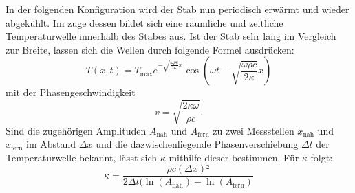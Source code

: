 In der folgenden Konfiguration wird der Stab nun periodisch erwärmt und
 wieder abgekühlt.
 Im zuge dessen bildet sich eine räumliche und zeitliche Temperaturwelle
  innerhalb des Stabes aus. Ist der Stab sehr lang im Vergleich zur Breite, lassen
   sich die Wellen durch folgende Formel ausdrücken:
  \begin{equation}
    T(x,t) = T_\text{max}e^{-\sqrt{{\frac{\omega \rho c}{2\kappa}}x}}\cos \left( \omega t - \sqrt{\frac{\omega \rho c}{2\kappa}}x \right)
  \end{equation}
mit der Phasengeschwindigkeit
\begin{equation}
  v = \sqrt{\frac{2 \kappa \omega}{\rho c}}\text{.}
\end{equation}
Sind die zugehörigen Amplituden $A_\text{nah}$ und $A_\text{fern}$ zu zwei Messstellen
$x_\text{nah}$ und $x_\text{fern}$ im Abstand $\Delta x$ und die dazwischenliegende Phasenverschiebung $\Delta t$
 der Temperaturwelle bekannt, lässt sich $\kappa$ mithilfe dieser bestimmen. Für $\kappa$ folgt:
 \begin{equation}
   \kappa = \frac{\rho c (\Delta x)²}{2 \Delta t (\ln(A_\text{nah})-\ln(A_\text{fern})}
 \end{equation}
